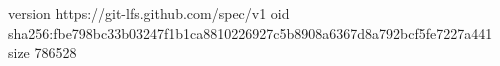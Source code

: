 version https://git-lfs.github.com/spec/v1
oid sha256:fbe798bc33b03247f1b1ca8810226927c5b8908a6367d8a792bcf5fe7227a441
size 786528
